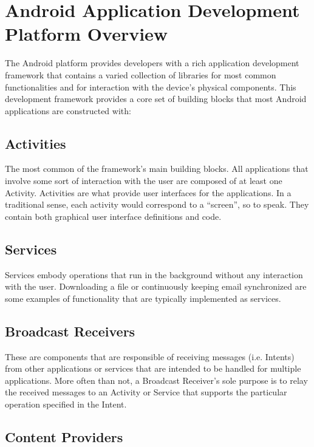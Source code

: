 \documentclass{sig-alternate}
\begin{document}
\section{Android Application Development Platform Overview}

The Android platform provides developers with a rich application development framework that contains a varied collection of libraries for most common functionalities and for interaction with the device's physical components. This development framework provides a core set of building blocks that most Android applications are constructed with:

\subsection{Activities}

The most common of the framework's main building blocks. All applications that involve some sort of interaction with the user are composed of at least one Activity. Activities are what provide user interfaces for the applications. In a traditional sense, each activity would correspond to a “screen”, so to speak. They contain both graphical user interface definitions and code.

\subsection{Services}

Services embody operations that run in the background without any interaction with the user. Downloading a file or continuously keeping email synchronized are some examples of functionality that are typically implemented as services.

\subsection{Broadcast Receivers}

These are components that are responsible of receiving messages (i.e. Intents) from other applications or services that are intended to be handled for multiple applications. More often than not, a Broadcast Receiver's sole purpose is to relay the received messages to an Activity or Service that supports the particular operation specified in the Intent.

\subsection{Content Providers}
\end{document}

